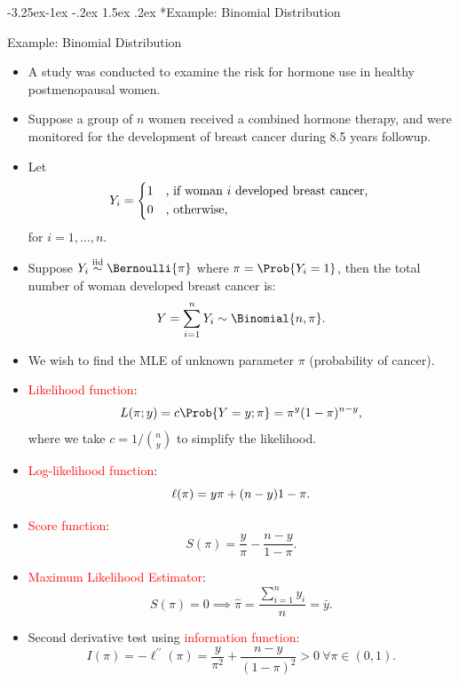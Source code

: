 \documentclass[final]{article}\usepackage[]{graphicx}\usepackage[svgnames]{xcolor}
\makeatletter
\renewcommand\subsection{\@startsection{subsection}{2}{\z@}%
                                     {-3.25ex\@plus -1ex \@minus -.2ex}%
                                     {1.5ex \@plus .2ex}%
                                     {\normalfont\large\bfseries\scshape\color{Blue}}}
\let\log\relax%
\newcommand{\iid}{\overset{\text{iid}}{\sim}}%
\makeatother
\begin{document}
\subsection*{Example: Binomial Distribution}
\begin{Example}{Example: Binomial Distribution}
      \begin{itemize}
            \item A study was conducted to examine the risk for hormone use in healthy
                  postmenopausal women.
            \item Suppose a group of $ n $ women received a combined hormone therapy, and were
                  monitored for the development of breast cancer during 8.5 years followup.
            \item Let
                  \[ Y_i=\begin{cases*}
                              1 & , if woman $ i $ developed breast cancer, \\
                              0 & , otherwise,
                        \end{cases*} \]
                  for $ i=1,\ldots,n $.
            \item Suppose $ Y_i \iid\Bernoulli{\pi} $ where $ \pi=\Prob{Y_i=1} $, then the total number of woman developed breast cancer is:
                  \[ Y=\sum_{i=1}^{n} Y_i \sim \Binomial{n,\pi}. \]
            \item We wish to find the MLE of unknown parameter $ \pi $ (probability of cancer).
      \end{itemize}
\end{Example}
\begin{itemize}
      \item \textcolor{Red}{Likelihood function}:
            \[ L(\pi;y)=c\Prob{Y=y;\pi}=\pi^y(1-\pi)^{n-y}, \]
            where we take $ c=1/\binom{n}{y} $ to simplify the likelihood.
      \item \textcolor{Red}{Log-likelihood function}:
            \[ \ell(\pi)=y\log{\pi}+(n-y)\log{1-\pi}. \]
      \item \textcolor{Red}{Score function}:
            \[ S(\pi)=\frac{y}{\pi}-\frac{n-y}{1-\pi}.  \]
      \item \textcolor{Red}{Maximum Likelihood Estimator}:
            \[ S(\pi)=0\implies \hat{\pi}=\frac{\sum_{i=1}^{n} y_i}{n}=\bar{y}. \]
      \item Second derivative test using \textcolor{Red}{information function}:
            \[ I(\pi)=-\ell^{\prime\prime}(\pi)=\frac{y}{\pi^2}+\frac{n-y}{(1-\pi)^2}>0\ \forall \pi\in(0,1). \]
\end{itemize}
\end{document}
